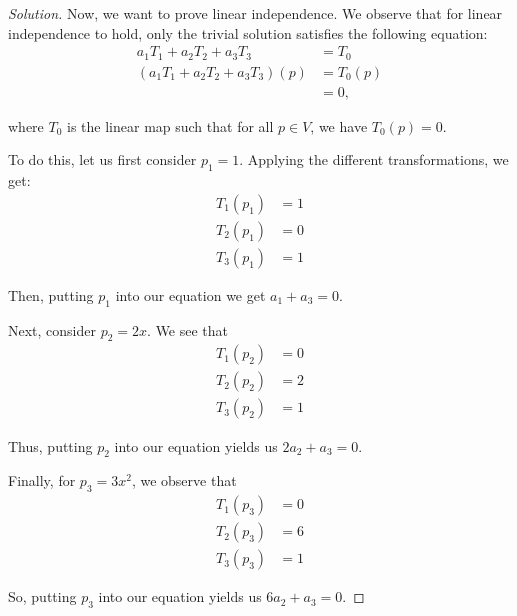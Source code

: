 \documentclass{article}
\newenvironment{solution}{\begin{proof}[Solution]}{\end{proof}}
\begin{document}
\begin{solution}
	Now, we want to prove linear independence. We observe that for linear independence to hold, only the trivial solution satisfies the following equation:
	\begin{align*}
		a_{1}T_{1} + a_{2}T_{2} + a_{3}T_{3} &= T_{0} \\
		(a_{1}T_{1} + a_{2}T_{2} + a_{3}T_{3})(p) &= T_{0}(p) \\
		&= 0,
	\end{align*}

	where $T_{0}$ is the linear map such that for all $p \in V$, we have $T_{0}(p) = 0$.
	
	\begin{comment}
		However, we observe here that since none of these functions are scalar multiples of each other, we can't get to the zero function using a linear combination of them. Thus, we see that $T_{1}, T_{2}, T_{3}$ are linearly independent.
	\end{comment}

	To do this, let us first consider $p_{1} = 1$. Applying the different transformations, we get:
	\begin{align*}
		T_{1}(p_{1}) &= 1 \\
		T_{2}(p_{1}) &= 0 \\
		T_{3}(p_{1}) &= 1
	\end{align*}

	Then, putting $p_{1}$ into our equation we get $a_{1} + a_{3} = 0$.
	
	Next, consider $p_{2} = 2x$. We see that
	\begin{align*}
		T_{1}(p_{2}) &= 0 \\
		T_{2}(p_{2}) &= 2 \\
		T_{3}(p_{2}) &= 1
	\end{align*}

	Thus, putting $p_{2}$ into our equation yields us $2a_{2} + a_{3} = 0$.
	
	Finally, for $p_{3} = 3x^{2}$, we observe that
	\begin{align*}
		T_{1}(p_{3}) &= 0 \\
		T_{2}(p_{3}) &= 6 \\
		T_{3}(p_{3}) &= 1
	\end{align*}

	So, putting $p_{3}$ into our equation yields us $6a_{2} + a_{3} = 0$.
	

\end{solution}
\end{document}
